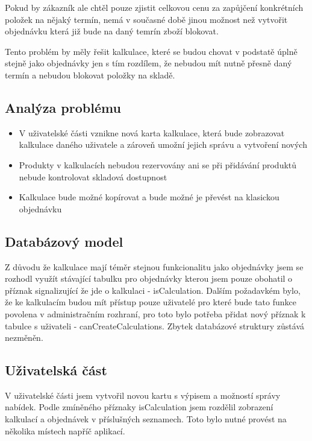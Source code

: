 Pokud by zákazník ale chtěl pouze zjistit celkovou cenu za zapůjčení konkrétních položek na nějaký termín, nemá v současné době jinou možnost než vytvořit objednávku která již bude na daný temrín zboží blokovat.

Tento problém by měly řešit kalkulace, které se budou chovat v podstatě úplně stejně jako objednávky jen s tím rozdílem, že nebudou mít nutně přesně daný termín a nebudou blokovat položky na skladě.

\subsection{Analýza problému}

\begin{itemize}
    \item V uživatelské části vznikne nová karta kalkulace, která bude zobrazovat kalkulace daného uživatele a zároveň umožní jejich správu a vytvoření nových
    \item Produkty v kalkulacích nebudou rezervovány ani se při přidávání produktů nebude kontrolovat skladová dostupnost
    \item Kalkulace bude možné kopírovat a bude možné je převést na klasickou objednávku
\end{itemize}

\subsection{Databázový model}

Z důvodu že kalkulace mají téměr stejnou funkcionalitu jako objednávky jsem se rozhodl využít stávající tabulku pro objednávky kterou jsem pouze obohatil o příznak signalizující že jde o kalkulaci - isCalculation. 
Dalším požadavkém bylo, že ke kalkulacím budou mít přístup pouze uživatelé pro které bude tato funkce povolena v administračním rozhraní, pro toto bylo potřeba přidat nový příznak k tabulce s uživateli - canCreateCalculations. Zbytek databázové struktury zůstává nezměněn. 

\subsection{Uživatelská část}

V uživatelské části jsem vytvořil novou kartu s výpisem a možností správy nabídek. Podle zmíněného příznaky isCalculation jsem rozdělil zobrazení kalkulací a objednávek v příslušných seznamech. Toto bylo nutné provést na několika místech napříč aplikací.

